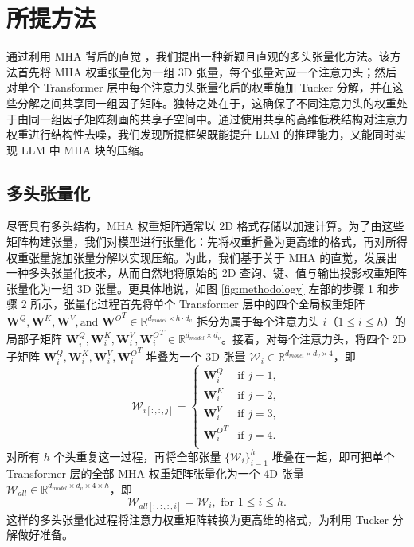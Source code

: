 \documentclass[conference]{IEEEtran}
\begin{document}
\section{所提方法}\label{methodology}
通过利用 MHA 背后的直觉 \cite{clark2019does, vig2019multiscale,vig2019analyzing}，我们提出一种新颖且直观的多头张量化方法。该方法首先将 MHA 权重张量化为一组 3D 张量，每个张量对应一个注意力头；然后对单个 Transformer 层中每个注意力头张量化后的权重施加 Tucker 分解，并在这些分解之间共享同一组因子矩阵。独特之处在于，这确保了不同注意力头的权重处于由同一组因子矩阵刻画的共享子空间中。通过使用共享的高维低秩结构对注意力权重进行结构性去噪，我们发现所提框架既能提升 LLM 的推理能力，又能同时实现 LLM 中 MHA 块的压缩。

\subsection{多头张量化}\label{tensorisation}
尽管具有多头结构，MHA 权重矩阵通常以 2D 格式存储以加速计算。为了由这些矩阵构建张量，我们对模型进行张量化：先将权重折叠为更高维的格式，再对所得权重张量施加张量分解以实现压缩。为此，我们基于关于 MHA 的直觉，发展出一种多头张量化技术，从而自然地将原始的 2D 查询、键、值与输出投影权重矩阵张量化为一组 3D 张量。更具体地说，如图 \ref{fig:methodology} 左部的步骤 1 和步骤 2 所示，张量化过程首先将单个 Transformer 层中的四个全局权重矩阵 $\mathbf{W}^Q, \mathbf{W}^K, \mathbf{W}^V, \text{and } {\mathbf{W}^O}^T \in \mathbb{R}^{d_{model} \times h \cdot d_v}$ 拆分为属于每个注意力头 $i$（$1\leq i \leq h$）的局部子矩阵 $\mathbf{W}^Q_i, \mathbf{W}^K_i, \mathbf{W}^V_i, {\mathbf{W}^O_i}^T \in \mathbb{R}^{d_{model} \times  d_v}$。接着，对每个注意力头，将四个 2D 子矩阵 $\mathbf{W}^Q_i, \mathbf{W}^K_i, \mathbf{W}^V_i, {\mathbf{W}^O_i}^T$ 堆叠为一个 3D 张量 $\mathcal{W}_i \in \mathbb{R}^{d_{model} \times d_v \times 4}$，即
\begin{equation}
    \mathcal{W}_{i [:,:,j]} = 
    \begin{cases} 
        \mathbf{W}^Q_i & \text{if } j = 1, \\
        \mathbf{W}^K_i & \text{if } j = 2, \\
        \mathbf{W}^V_i & \text{if } j = 3, \\
        {\mathbf{W}^O_i}^T & \text{if } j = 4. \\
    \end{cases}
    \label{eq:single_head_weight}
\end{equation}
对所有 $h$ 个头重复这一过程，再将全部张量 $\{\mathcal{W}_i \}_{i=1}^h$ 堆叠在一起，即可把单个 Transformer 层的全部 MHA 权重矩阵张量化为一个 4D 张量 $\mathcal{W}_{all} \in \mathbb{R}^{d_{model} \times d_v \times 4 \times h}$，即
\begin{equation}
    \mathcal{W}_{all[:,:,:,i]} = \mathcal{W}_i ,\text{ for  } 1\leq i \leq h.
    \label{eq:allweights}
\end{equation}
这样的多头张量化过程将注意力权重矩阵转换为更高维的格式，为利用 Tucker 分解做好准备。
\end{document}
